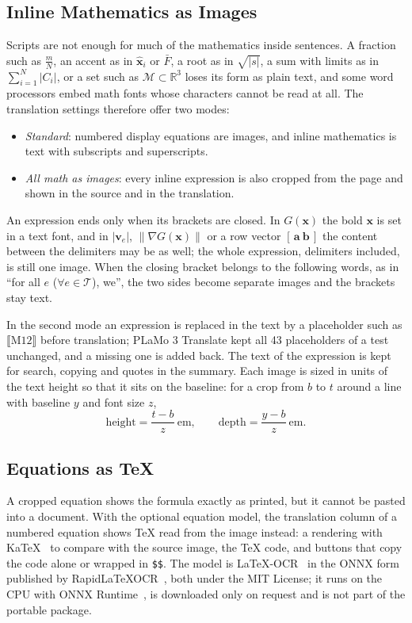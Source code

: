 \documentclass[11pt]{article}
\begin{document}
\subsection{Inline Mathematics as Images}
\label{sec:inline-math}
Scripts are not enough for much of the mathematics inside sentences. A fraction such as $\frac{m}{N}$, an accent as in $\hat{\mathbf{x}}_i$ or $\bar{F}$, a root as in $\sqrt{\lvert s \rvert}$, a sum with limits as in $\sum_{i=1}^{N} \lvert C_i \rvert$, or a set such as $\mathcal{M} \subset \mathbb{R}^3$ loses its form as plain text, and some word processors embed math fonts whose characters cannot be read at all. The translation settings therefore offer two modes:
\begin{itemize}
  \item \emph{Standard}: numbered display equations are images, and inline mathematics is text with subscripts and superscripts.
  \item \emph{All math as images}: every inline expression is also cropped from the page and shown in the source and in the translation.
\end{itemize}
An expression ends only when its brackets are closed. In $G(\mathbf{x})$ the bold $\mathbf{x}$ is set in a text font, and in $\lvert \mathbf{v}_e \rvert$, $\lVert \nabla G(\mathbf{x}) \rVert$ or a row vector $[\, \mathbf{a}\ \mathbf{b} \,]$ the content between the delimiters may be as well; the whole expression, delimiters included, is still one image. When the closing bracket belongs to the following words, as in ``for all $e$ ($\forall e \in \mathcal{T}$), we'', the two sides become separate images and the brackets stay text.

In the second mode an expression is replaced in the text by a placeholder such as $\llbracket \mathrm{M12} \rrbracket$ before translation; PLaMo 3 Translate kept all 43 placeholders of a test unchanged, and a missing one is added back. The text of the expression is kept for search, copying and quotes in the summary. Each image is sized in units of the text height so that it sits on the baseline: for a crop from $b$ to $t$ around a line with baseline $y$ and font size $z$,
\begin{equation}
  \text{height} = \frac{t - b}{z}\ \text{em}, \qquad \text{depth} = \frac{y - b}{z}\ \text{em}.
  \label{eq:inline-size}
\end{equation}

\subsection{Equations as \TeX}
\label{sec:tex}
A cropped equation shows the formula exactly as printed, but it cannot be pasted into a document. With the optional equation model, the translation column of a numbered equation shows \TeX{} read from the image instead: a rendering with KaTeX~\cite{katex} to compare with the source image, the \TeX{} code, and buttons that copy the code alone or wrapped in \verb|$$|. The model is LaTeX-OCR~\cite{latexocr} in the ONNX form published by RapidLaTeXOCR~\cite{rapidlatexocr}, both under the MIT License; it runs on the CPU with ONNX Runtime~\cite{onnxruntime}, is downloaded only on request and is not part of the portable package.
\end{document}
